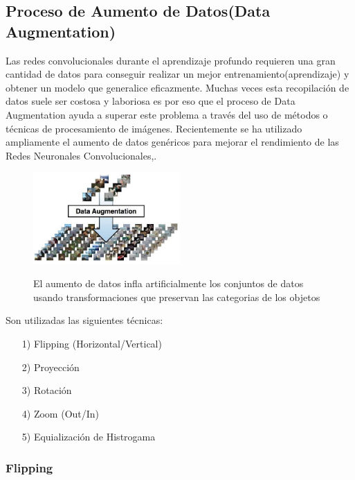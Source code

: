 	\subsection{Proceso de Aumento de Datos(Data Augmentation)}

		Las redes convolucionales durante el aprendizaje profundo requieren una gran cantidad de datos para conseguir realizar un mejor entrenamiento(aprendizaje) y obtener un modelo que generalice eficazmente. Muchas veces esta recopilación de datos suele ser costosa y laboriosa es por eso que el proceso de Data Augmentation ayuda a superar este problema a través del uso de métodos o técnicas de procesamiento de imágenes. Recientemente se ha utilizado ampliamente el aumento de datos genéricos para mejorar el rendimiento de las Redes Neuronales Convolucionales,\citep{DL_augmentData}. 

		\begin{figure}[H]
		\begin{center}
		\includegraphics[width=0.5\textwidth ]{images/desarrollo/Augment/exampleaug}
		\end{center}
		\begin{center}
		\caption{\small{El aumento de datos infla artificialmente los conjuntos de datos usando transformaciones que preservan las categorias de los objetos}}
		{\small{\cite{DL_augmentData}}}
		\end{center}
		\vspace{-1.5em}
		\end{figure}


		Son utilizadas las siguientes técnicas:
		\begin{enumerate}
		\item[1)] Flipping (Horizontal/Vertical)
		\item[2)] Proyección
		\item[3)] Rotación
		\item[4)] Zoom (Out/In)
		\item[5)] Equialización de Histrogama
		\vskip 3cm
		\end{enumerate} 
		
		\subsubsection{Flipping}
		
